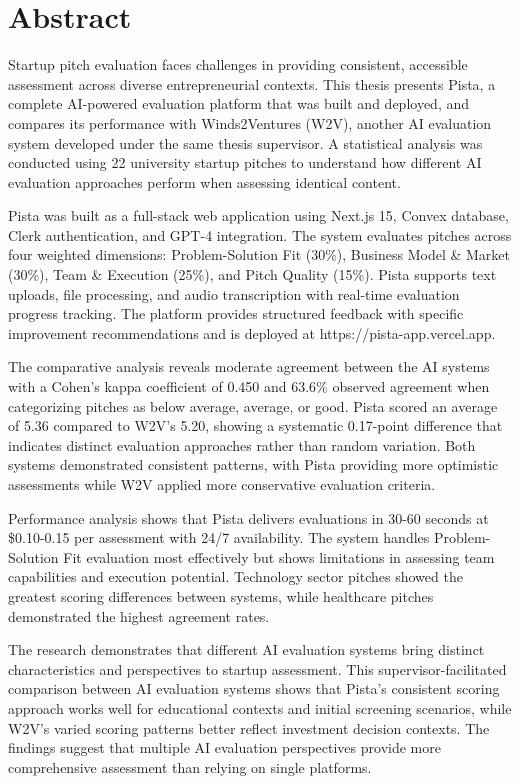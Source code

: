 \chapter*{Abstract}
Startup pitch evaluation faces challenges in providing consistent, accessible assessment across diverse entrepreneurial contexts. This thesis presents Pista, a complete AI-powered evaluation platform that was built and deployed, and compares its performance with Winds2Ventures (W2V), another AI evaluation system developed under the same thesis supervisor. A statistical analysis was conducted using 22 university startup pitches to understand how different AI evaluation approaches perform when assessing identical content.

Pista was built as a full-stack web application using Next.js 15, Convex database, Clerk authentication, and GPT-4 integration. The system evaluates pitches across four weighted dimensions: Problem-Solution Fit (30\%), Business Model \& Market (30\%), Team \& Execution (25\%), and Pitch Quality (15\%). Pista supports text uploads, file processing, and audio transcription with real-time evaluation progress tracking. The platform provides structured feedback with specific improvement recommendations and is deployed at https://pista-app.vercel.app.

The comparative analysis reveals moderate agreement between the AI systems with a Cohen's kappa coefficient of 0.450 and 63.6\% observed agreement when categorizing pitches as below average, average, or good. Pista scored an average of 5.36 compared to W2V's 5.20, showing a systematic 0.17-point difference that indicates distinct evaluation approaches rather than random variation. Both systems demonstrated consistent patterns, with Pista providing more optimistic assessments while W2V applied more conservative evaluation criteria.

Performance analysis shows that Pista delivers evaluations in 30-60 seconds at \$0.10-0.15 per assessment with 24/7 availability. The system handles Problem-Solution Fit evaluation most effectively but shows limitations in assessing team capabilities and execution potential. Technology sector pitches showed the greatest scoring differences between systems, while healthcare pitches demonstrated the highest agreement rates.

The research demonstrates that different AI evaluation systems bring distinct characteristics and perspectives to startup assessment. This supervisor-facilitated comparison between AI evaluation systems shows that Pista's consistent scoring approach works well for educational contexts and initial screening scenarios, while W2V's varied scoring patterns better reflect investment decision contexts. The findings suggest that multiple AI evaluation perspectives provide more comprehensive assessment than relying on single platforms.

